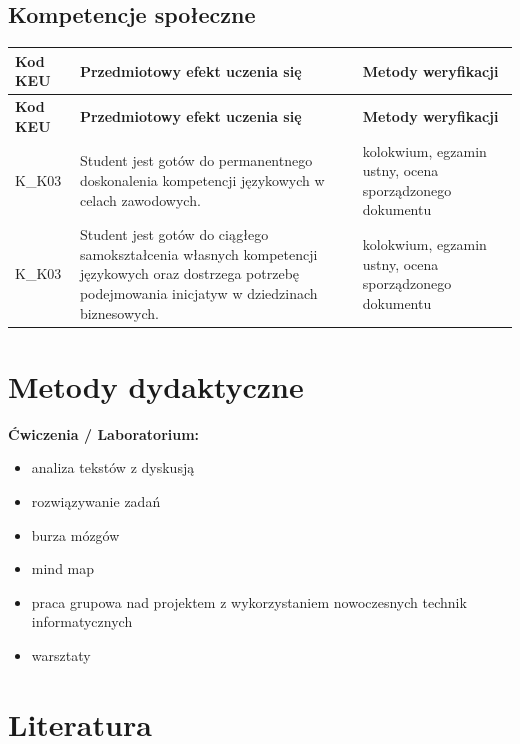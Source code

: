 \documentclass[12pt, a4paper]{article}
\newcommand{\thdrule}{\noalign{\global\setlength{\extrarowheight}{0pt}}}
\newcommand{\thdend}{\noalign{\global\setlength{\extrarowheight}{3pt}}}
\begin{document}
\subsection*{Kompetencje społeczne}
{\scriptsize
\begin{longtable}{m{1.6cm}m{9.0cm}m{4.2cm}}
\thdrule\toprule
\rowcolor{pjatkRed} {\color{white}\footnotesize\textbf{\vphantom{Ag}Kod KEU}} & {\color{white}\footnotesize\textbf{\vphantom{Ag}Przedmiotowy efekt uczenia się}} & {\color{white}\footnotesize\textbf{\vphantom{Ag}Metody weryfikacji}} \\
\midrule\thdend
\endfirsthead
\thdrule\toprule
\rowcolor{pjatkRed} {\color{white}\footnotesize\textbf{\vphantom{Ag}Kod KEU}} & {\color{white}\footnotesize\textbf{\vphantom{Ag}Przedmiotowy efekt uczenia się}} & {\color{white}\footnotesize\textbf{\vphantom{Ag}Metody weryfikacji}} \\
\midrule\thdend
\endhead
  \rowcolor{tableRowLight} K\_K03 & Student jest gotów do permanentnego doskonalenia kompetencji językowych w celach zawodowych. & kolokwium, egzamin ustny, ocena sporządzonego dokumentu \\
  \rowcolor{tableRowAlt} K\_K03 & Student jest gotów do ciągłego samokształcenia własnych kompetencji językowych oraz dostrzega potrzebę podejmowania inicjatyw w dziedzinach biznesowych. & kolokwium, egzamin ustny, ocena sporządzonego dokumentu \\
\bottomrule
\end{longtable}}

\section{Metody dydaktyczne}

\textbf{Ćwiczenia / Laboratorium:}
\begin{itemize}
  \item analiza tekstów z dyskusją
  \item rozwiązywanie zadań
  \item burza mózgów
  \item mind map
  \item praca grupowa nad projektem z wykorzystaniem nowoczesnych technik informatycznych
  \item warsztaty
\end{itemize}
\vspace{4pt}


\section{Literatura}
\end{document}
